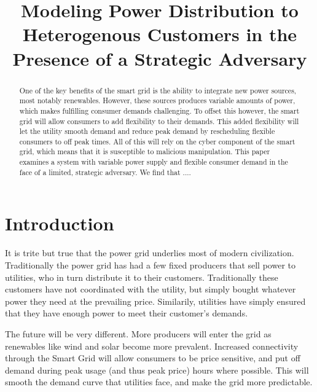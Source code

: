 \documentclass[conference]{IEEEtran}
\begin{document}
\title{Modeling Power Distribution to Heterogenous Customers in the Presence of a Strategic Adversary}

\author{
}

\maketitle

\begin{abstract}
One of the key benefits of the smart grid is the ability to integrate new power sources, most notably renewables.  However, these sources produces variable amounts of power, which makes fulfilling consumer demands challenging.  To offset this however, the smart grid will allow consumers to add flexibility to their demands.  This added flexibility will let the utility smooth demand and reduce peak demand by rescheduling flexible consumers to off peak times.  All of this will rely on the cyber component of the smart grid, which means that it is susceptible to malicious manipulation.  This paper examines a system with variable power supply and flexible consumer demand in the face of a limited, strategic adversary.  We find that ....
\end{abstract}

\section{Introduction}

It is trite but true that the power grid underlies most of modern civilization.  Traditionally the power grid has had a 
few fixed producers that sell power to utilities, who in turn distribute it to their customers.  Traditionally these 
customers have not coordinated with the utility, but simply bought whatever power they need at the prevailing price.  
Similarily, utilities have simply ensured that they have enough power to meet their customer's demands.  

The future will be very different.  More producers will enter the grid as renewables like wind and solar become more
prevalent.  Increased connectivity through the Smart Grid will allow consumers to be price sensitive, and put off 
demand during peak usage (and thus peak price) hours where possible.  This will smooth the demand curve that utilities face,
and make the grid more predictable.
\end{document}
